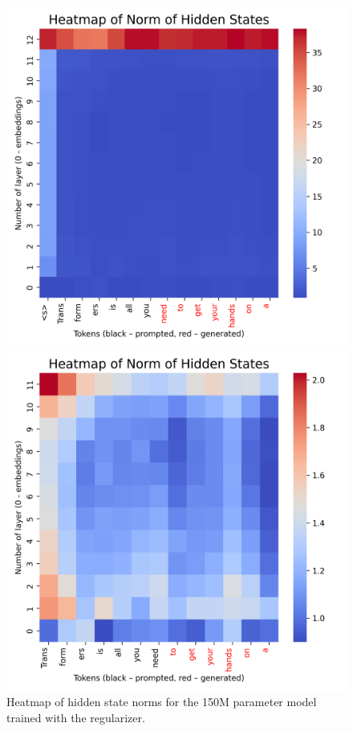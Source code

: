 \begin{figure}[t]
    \centering
    \begin{minipage}{0.48\textwidth}
        \centering
        \includegraphics[width=\textwidth]{images/heatmap_150m_reg_all.png}
        \caption{Heatmap of hidden state norms for the 150M parameter model trained with the regularizer.}
        \label{fig:heatmap_150m_reg_all}
    \end{minipage}
    \hfill
    \begin{minipage}{0.48\textwidth}
        \centering
        \includegraphics[width=\textwidth]{images/heatmap_150m_reg_notall.png}

\end{minipage}
\end{figure}
